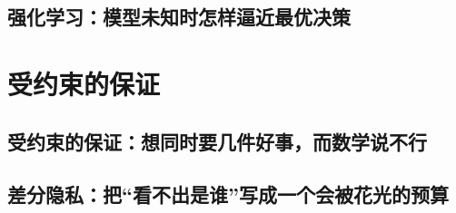 \documentclass[UTF8,openany]{ctexbook}
\theoremstyle{definition}
\theoremstyle{plain}
\begin{document}
\chapter*{强化学习：模型未知时怎样逼近最优决策}
\label{ch:139}











\clearpage
\part{受约束的保证}
\chapter*{受约束的保证：想同时要几件好事，而数学说不行}
\label{ch:140}

\clearpage
\chapter*{差分隐私：把``看不出是谁''写成一个会被花光的预算}
\label{ch:141}




\clearpage
\end{document}
